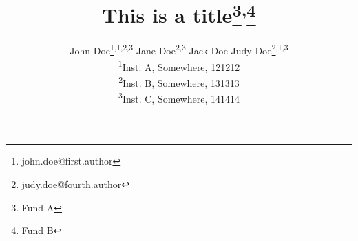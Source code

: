 \title{This is a title\thanks{Fund A}\textsuperscript{,}\thanks{Fund B}}
\author{John Doe\thanks{john.doe@first.author}\textsuperscript{,}\textsuperscript{1}\textsuperscript{,}\textsuperscript{2}\textsuperscript{,}\textsuperscript{3}
Jane Doe\textsuperscript{2}\textsuperscript{,}\textsuperscript{3}
Jack Doe
Judy Doe\thanks{judy.doe@fourth.author}\textsuperscript{,}\textsuperscript{1}\textsuperscript{,}\textsuperscript{3}
\\
\textsuperscript{1}Inst. A, Somewhere, 121212\\
\textsuperscript{2}Inst. B, Somewhere, 131313\\
\textsuperscript{3}Inst. C, Somewhere, 141414}
